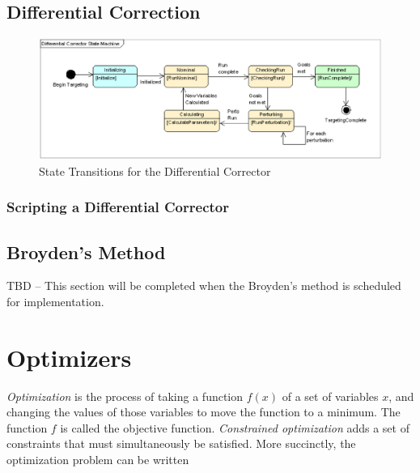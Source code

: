 \subsection{Differential Correction}

\begin{figure}[htb]
\begin{center}
\includegraphics[scale=0.5]{Images/DifferentialCorrectorStateMachine.eps}
\caption{\label{figure:DifferentialCorrectorStateMachine}State Transitions for
the Differential Corrector}
\end{center}
\end{figure}

\subsubsection{Scripting a Differential Corrector}

\begin{quote}
\end{quote}


\subsection{Broyden's Method}

TBD -- This section will be completed when the Broyden's method is scheduled for implementation.

\section{Optimizers}

\textit{Optimization} is the process of taking a function $f(x)$ of a set of variables $x$, and
changing the values of those variables to move the function to a minimum.  The function $f$ is
called the objective function.  \textit{Constrained optimization} adds a set of constraints that
must simultaneously be satisfied.  More succinctly, the optimization problem can be written

